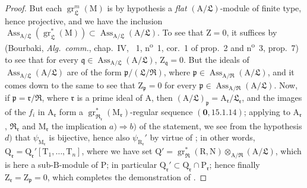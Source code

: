 \begin{proof}
But each $\operatorname{gr}_\mathfrak{L}^m(\mathrm{M})$ is by hypothesis a \emph{flat} $(\mathrm{A}/\mathfrak{L})$-module of finite type, hence projective, and we have the inclusion $\operatorname{Ass}_{\mathrm{A}/\mathfrak{L}}(\operatorname{gr}_\mathfrak{L}^*(\mathrm{M}))\subset\operatorname{Ass}_{\mathrm{A}/\mathfrak{L}}(\mathrm{A}/\mathfrak{L})$. To see that $\mathrm{Z}=0$, it suffices by (Bourbaki, \emph{Alg.~comm.}, chap.~IV, \textsection~1, n\textsuperscript{o}~1, cor.~1 of prop.~2 and n\textsuperscript{o}~3, prop.~7) to see that for every $\mathfrak{q}\in\operatorname{Ass}_{\mathrm{A}/\mathfrak{L}}(\mathrm{A}/\mathfrak{L})$, $\mathrm{Z}_\mathfrak{q}=0$. But the ideals of $\operatorname{Ass}_{\mathrm{A}/\mathfrak{L}}(\mathrm{A}/\mathfrak{L})$ are of the form $\mathfrak{p}/(\mathfrak{L}/\mathfrak{R})$, where $\mathfrak{p}\in\operatorname{Ass}_{\mathrm{A}/\mathfrak{R}}(\mathrm{A}/\mathfrak{L})$, and it comes down to the same to see that $\mathrm{Z}_\mathfrak{p}=0$ for every $\mathfrak{p}\in\operatorname{Ass}_{\mathrm{A}/\mathfrak{R}}(\mathrm{A}/\mathfrak{L})$. Now, if $\mathfrak{p}=\mathfrak{r}/\mathfrak{R}$, where $\mathfrak{r}$ is a prime ideal of $\mathrm{A}$, then $(\mathrm{A}/\mathfrak{L})_\mathfrak{p}=\mathrm{A}_\mathfrak{r}/\mathfrak{L}_\mathfrak{r}$, and the images of the $f_i$ in $\mathrm{A}_\mathfrak{r}$ form a $\operatorname{gr}_{\mathfrak{R}_\mathfrak{r}}^*(\mathrm{M}_\mathfrak{r})$-regular sequence $(\mathbf{0},15.1.14)$; applying to $\mathrm{A}_\mathfrak{r}$, $\mathfrak{R}_\mathfrak{r}$ and $\mathrm{M}_\mathfrak{r}$ the implication $a)\Rightarrow b)$ of the statement, we see from the hypothesis $d)$ that $\psi_{\mathrm{M}_\mathfrak{r}}$ is bijective, hence also $\psi_{\mathrm{R}_\mathfrak{r}}'$ by virtue of ; in other words, $\mathrm{Q}_\mathfrak{r}=\mathrm{Q}_\mathfrak{r}'[\mathrm{T}_1,\ldots,\mathrm{T}_n]$, where we have set $\mathrm{Q}'=\operatorname{gr}_\mathfrak{R}^*(\mathrm{R},\mathrm{N})\otimes_{\mathrm{A}/\mathfrak{R}}(\mathrm{A}/\mathfrak{L})$, which is here a sub-$\mathrm{B}$-module of $\mathrm{P}$; in particular $\mathrm{Q}_\mathfrak{r}'\subset\mathrm{Q}_\mathfrak{r}\cap\mathrm{P}_\mathfrak{r}$; hence finally $\mathrm{Z}_\mathfrak{r}=\mathrm{Z}_\mathfrak{p}=0$, which completes the demonstration of .


\end{proof}
